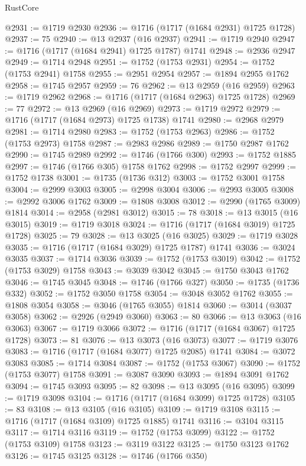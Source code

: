 \begin{lexlean}{RustCore}
\begin{coremodule}
@2931 := @1719 @2930
@2936 := @1716 (@1717 (@1684 @2931) @1725 @1728)
@2937 := 75
@2940 := @13 @2937 (@16 @2937)
@2941 := @1719 @2940
@2947 := @1716 (@1717 (@1684 @2941) @1725 @1787) @1741
@2948 := @2936 @2947
@2949 := @1714 @2948
@2951 := @1752 (@1753 @2931)
@2954 := @1752 (@1753 @2941) @1758
@2955 := @2951 @2954
@2957 := @1894 @2955 @1762
@2958 := @1745 @2957
@2959 := 76
@2962 := @13 @2959 (@16 @2959)
@2963 := @1719 @2962
@2968 := @1716 (@1717 (@1684 @2963) @1725 @1728)
@2969 := 77
@2972 := @13 @2969 (@16 @2969)
@2973 := @1719 @2972
@2979 := @1716 (@1717 (@1684 @2973) @1725 @1738) @1741
@2980 := @2968 @2979
@2981 := @1714 @2980
@2983 := @1752 (@1753 @2963)
@2986 := @1752 (@1753 @2973) @1758
@2987 := @2983 @2986
@2989 := @1750 @2987 @1762
@2990 := @1745 @2989
@2992 := @1746 (@1766 @300)
@2993 := @1752 @1885
@2997 := @1746 (@1766 @305) @1758 @1762
@2998 := @1752 @2997
@2999 := @1752 @1738
@3001 := @1735 (@1736 @312)
@3003 := @1752 @3001 @1758
@3004 := @2999 @3003
@3005 := @2998 @3004
@3006 := @2993 @3005
@3008 := @2992 @3006 @1762
@3009 := @1808 @3008
@3012 := @2990 (@1765 @3009) @1814
@3014 := @2958 (@2981 @3012)
@3015 := 78
@3018 := @13 @3015 (@16 @3015)
@3019 := @1719 @3018
@3024 := @1716 (@1717 (@1684 @3019) @1725 @1728)
@3025 := 79
@3028 := @13 @3025 (@16 @3025)
@3029 := @1719 @3028
@3035 := @1716 (@1717 (@1684 @3029) @1725 @1787) @1741
@3036 := @3024 @3035
@3037 := @1714 @3036
@3039 := @1752 (@1753 @3019)
@3042 := @1752 (@1753 @3029) @1758
@3043 := @3039 @3042
@3045 := @1750 @3043 @1762
@3046 := @1745 @3045
@3048 := @1746 (@1766 @327)
@3050 := @1735 (@1736 @332)
@3052 := @1752 @3050 @1758
@3054 := @3048 @3052 @1762
@3055 := @1808 @3054
@3058 := @3046 (@1765 @3055) @1814
@3060 := @3014 (@3037 @3058)
@3062 := @2926 (@2949 @3060)
@3063 := 80
@3066 := @13 @3063 (@16 @3063)
@3067 := @1719 @3066
@3072 := @1716 (@1717 (@1684 @3067) @1725 @1728)
@3073 := 81
@3076 := @13 @3073 (@16 @3073)
@3077 := @1719 @3076
@3083 := @1716 (@1717 (@1684 @3077) @1725 @2085) @1741
@3084 := @3072 @3083
@3085 := @1714 @3084
@3087 := @1752 (@1753 @3067)
@3090 := @1752 (@1753 @3077) @1758
@3091 := @3087 @3090
@3093 := @1894 @3091 @1762
@3094 := @1745 @3093
@3095 := 82
@3098 := @13 @3095 (@16 @3095)
@3099 := @1719 @3098
@3104 := @1716 (@1717 (@1684 @3099) @1725 @1728)
@3105 := 83
@3108 := @13 @3105 (@16 @3105)
@3109 := @1719 @3108
@3115 := @1716 (@1717 (@1684 @3109) @1725 @1885) @1741
@3116 := @3104 @3115
@3117 := @1714 @3116
@3119 := @1752 (@1753 @3099)
@3122 := @1752 (@1753 @3109) @1758
@3123 := @3119 @3122
@3125 := @1750 @3123 @1762
@3126 := @1745 @3125
@3128 := @1746 (@1766 @350)

\end{coremodule}
\end{lexlean}
